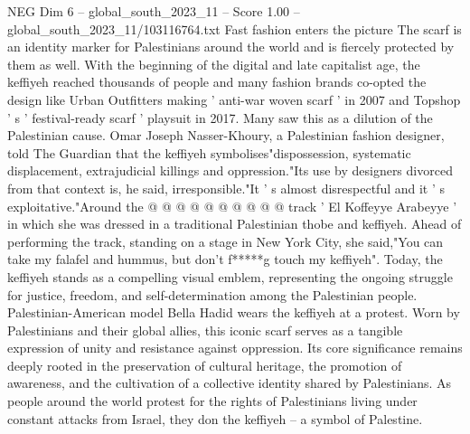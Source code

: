 \begin{textsample}{NEG Dim 6 – global\_south\_2023\_11 – Score 1.00 – global\_south\_2023\_11/103116764.txt}
Fast fashion enters the picture The scarf is an identity marker for Palestinians around the world and is fiercely protected by them as well.
With the beginning of the digital and late capitalist age, the keffiyeh reached thousands of people and many fashion brands co-opted the design like Urban Outfitters making ' anti-war woven scarf ' in 2007 and Topshop ' s ' festival-ready scarf ' playsuit in 2017.
Many saw this as a dilution of the Palestinian cause.
Omar Joseph Nasser-Khoury, a Palestinian fashion designer, told The Guardian that the keffiyeh symbolises"dispossession, systematic displacement, extrajudicial killings and oppression."Its use by designers divorced from that context is, he said, irresponsible."It ' s almost disrespectful and it ' s exploitative."Around the @ @ @ @ @ @ @ @ @ @ track ' El Koffeyye Arabeyye ' in which she was dressed in a traditional Palestinian thobe and keffiyeh.
Ahead of performing the track, standing on a stage in New York City, she said,"You can take my falafel and hummus, but don't f*****g touch my keffiyeh".
Today, the keffiyeh stands as a compelling visual emblem, representing the ongoing struggle for justice, freedom, and self-determination among the Palestinian people.
Palestinian-American model Bella Hadid wears the keffiyeh at a protest.
Worn by Palestinians and their global allies, this iconic scarf serves as a tangible expression of unity and resistance against oppression.
Its core significance remains deeply rooted in the preservation of cultural heritage, the promotion of awareness, and the cultivation of a collective identity shared by Palestinians.
As people around the world protest for the rights of Palestinians living under constant attacks from Israel, they don the keffiyeh -- a symbol of Palestine.

\end{textsample}
